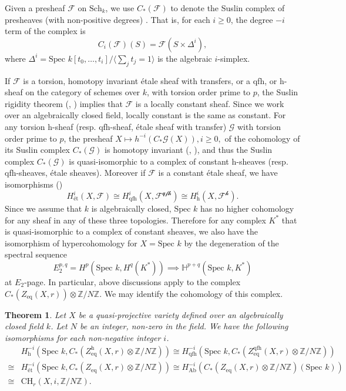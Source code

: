 \documentclass{amsart}
\newtheorem{thm}[theorem]{Theorem}
\theoremstyle{definition}
\theoremstyle{remark}
\newcommand{\mbb}{\mathbb}
\newcommand{\ZZ}{\mbb{Z}}
\newcommand{\SP}{\text{Spec }}
\newcommand{\eq}{\text{eq}}
\begin{document}
Given a presheaf $\mathcal{F}$ on $\text{Sch}_k$, we use $C_*(\mathcal{F})$ to denote the Suslin complex of presheaves (with non-positive degrees) \cite[Definition 2.14]{Mazza_Voevodsky_Weibel_Lecture_motivic_cohomology}.
That is, for each $i\geq 0$, the degree $-i$ term of the complex is $$C_{i}(\mathcal{F})(S)=\mathcal{F}(S \times \Delta^i),$$ where $\Delta^i=\SP k[t_0, \ldots, t_i]/\langle \sum_j t_j=1 \rangle$ is the algebraic $i$-simplex. 


If $\mathcal{F}$ is a torsion, homotopy invariant \'etale sheaf with transfers, or a qfh, or h-sheaf on the category of schemes over $k$, with torsion order prime to $p$, the Suslin rigidity theorem (\cite[Theorem 4.5]{Suslin_Voevodsky_homology}, \cite[Theorem 7.20]{Mazza_Voevodsky_Weibel_Lecture_motivic_cohomology}) implies that $\mathcal{F}$ is a locally constant sheaf. Since we work over an algebraically closed field, locally constant is the same as constant. For any torsion h-sheaf (resp. qfh-sheaf, \'etale sheaf with transfer) $\mathcal{G}$ with torsion order prime to $p$, the presheaf $X \mapsto h^{-i}(C_*\mathcal{G}(X)), i\geq 0,$ of the cohomology of its Suslin complex $C_*(\mathcal{G})$ is homotopy invariant (\cite[Corollary 7.5]{Suslin_Voevodsky_homology}, \cite[Corollary 2.19]{Mazza_Voevodsky_Weibel_Lecture_motivic_cohomology}), and thus the Suslin complex $C_*(\mathcal{G})$ is quasi-isomorphic to a complex of constant h-sheaves (resp. qfh-sheaves, \'etale sheaves). 
Moreover if $\mathcal{F}$ is a constant \'etale sheaf, we have isomorphisms (\cite[Theorem 10.2, 10.7]{Suslin_Voevodsky_homology})
\[
H^i_\text{\'et}(X, \mathcal{F}) \cong H^i_\text{qfh}(X, \mathcal{F^{\text{qfh}}}) \cong H^i_\text{h}(X, \mathcal{F^\text{h}}).
\]
Since we assume that $k$ is algebraically closed, $\SP k$ has no higher cohomology for any sheaf in any of these three topologies. 
Therefore for any complex $K^*$ that is quasi-isomorphic to a complex of constant sheaves, we also have the isomorphism of hypercohomology for $X=\SP k$ by the degeneration of the spectral sequence $$E_2^{p, q}=H^p(\SP k, H^q(K^*))\implies \mathbb{H}^{p+q}(\SP k, K^*)$$ at $E_2$-page.
In  particular, above discussions apply to  the complex $C_*(Z_\eq(X, r))\otimes \ZZ/N \ZZ$.
We may identify the cohomology of this complex.
\begin{thm}\label{thm:computation}
Let $X$ be a  quasi-projective variety defined over an algebraically closed field $k$. Let $N$ be an integer, non-zero in the field. We have the following isomorphisms for each non-negative integer $i$.
\begin{align*}
    &H^{-i}_\text{h}(\SP k, C_*(Z_\eq^\text{h}(X, r)\otimes \ZZ/N \ZZ)) \cong H^{-i}_\text{qfh}(\SP k, C_*(Z_\eq^\text{qfh}(X, r)\otimes \ZZ/N \ZZ))\\
\cong &H^{-i}_\text{\'et}(\SP k, C_*(Z_\eq(X, r)\otimes \ZZ/N \ZZ)) \cong H^{-i}_\text{Ab}(C_*(Z_\eq(X, r)\otimes \ZZ/N \ZZ)(\SP k))\\
\cong &\text{CH}_{r}(X, i, \ZZ/N \ZZ).
\end{align*}
\end{thm}
\end{document}
